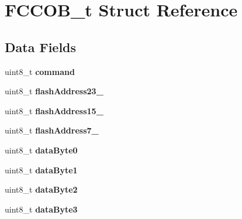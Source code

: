 \hypertarget{struct_f_c_c_o_b__t}{}\section{F\+C\+C\+O\+B\+\_\+t Struct Reference}
\label{struct_f_c_c_o_b__t}
\subsection*{Data Fields}
\begin{DoxyCompactItemize}
\item 
\hypertarget{struct_f_c_c_o_b__t_a6630cc4f8781ce47a078cd1390128f0d}{}uint8\+\_\+t {\bfseries command}\label{struct_f_c_c_o_b__t_a6630cc4f8781ce47a078cd1390128f0d}

\item 
\hypertarget{struct_f_c_c_o_b__t_a5ab94f5f60043779050affe43bb59273}{}uint8\+\_\+t {\bfseries flash\+Address23\+\_}\label{struct_f_c_c_o_b__t_a5ab94f5f60043779050affe43bb59273}

\item 
\hypertarget{struct_f_c_c_o_b__t_aa7fe80d46d063e5d55506135b643f90f}{}uint8\+\_\+t {\bfseries flash\+Address15\+\_}\label{struct_f_c_c_o_b__t_aa7fe80d46d063e5d55506135b643f90f}

\item 
\hypertarget{struct_f_c_c_o_b__t_a8890ca964d1467dae332b39bb00c278d}{}uint8\+\_\+t {\bfseries flash\+Address7\+\_}\label{struct_f_c_c_o_b__t_a8890ca964d1467dae332b39bb00c278d}

\item 
\hypertarget{struct_f_c_c_o_b__t_aef042f1241f3982a4faa0299048eab49}{}uint8\+\_\+t {\bfseries data\+Byte0}\label{struct_f_c_c_o_b__t_aef042f1241f3982a4faa0299048eab49}

\item 
\hypertarget{struct_f_c_c_o_b__t_aa34855584c816e66616561f4edba78bd}{}uint8\+\_\+t {\bfseries data\+Byte1}\label{struct_f_c_c_o_b__t_aa34855584c816e66616561f4edba78bd}

\item 
\hypertarget{struct_f_c_c_o_b__t_a4bc1c5095c76d5f46b368827272952bd}{}uint8\+\_\+t {\bfseries data\+Byte2}\label{struct_f_c_c_o_b__t_a4bc1c5095c76d5f46b368827272952bd}

\item 
\hypertarget{struct_f_c_c_o_b__t_a475561ff9c69fcd630137a48ca1bfd6b}{}uint8\+\_\+t {\bfseries data\+Byte3}\label{struct_f_c_c_o_b__t_a475561ff9c69fcd630137a48ca1bfd6b}


\end{DoxyCompactItemize}
